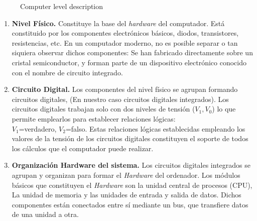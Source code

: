 \begin{paracol}{2}
\begin{figure}[ht]
	\renewcommand{\figurename}{Figure}
	\caption{Computer level description}
	\label{fig:nivele}
\end{figure}
\switchcolumn
\begin{enumerate}
\item \textbf{Nivel Físico.} Constituye la base del \emph{hardware} del computador. Está constituido por los componentes electrónicos básicos, diodos, transistores, resistencias, etc.  En un computador moderno, no es posible separar o tan siquiera observar dichos componentes: Se han fabricado directamente sobre un cristal semiconductor, y forman parte de un dispositivo electrónico conocido con el nombre de circuito integrado.

\item \textbf{Circuito Digital.}
Los componentes del nivel físico se agrupan formando circuitos digitales, (En nuestro caso circuitos digitales integrados). Los circuitos digitales trabajan solo con dos niveles de tensión ($V_1, V_0$) lo que permite emplearlos para establecer relaciones lógicas:\\ $V_1$=verdadero, $V_2$=falso. Estas relaciones lógicas establecidas empleando los valores de la tensión de los circuitos digitales constituyen el soporte de todos los cálculos que el computador puede realizar.

\item \textbf{Organización Hardware del sistema.} 
Los circuitos digitales integrados se agrupan y organizan para formar el \emph{Hardware} del ordenador.  Los módulos básicos que constituyen el \emph{Hardware} son la unidad central de procesos (CPU), La unidad de memoria y las unidades de entrada y salida de datos. Dichos componentes están conectados entre sí mediante un bus, que transfiere datos de una unidad a otra.


\end{enumerate}
\end{paracol}
